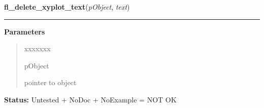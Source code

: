     \label{xformslib:library:fl_delete_xyplot_text}

    \vspace{0.5ex}

\hspace{.8\funcindent}\begin{boxedminipage}{\funcwidth}

    \raggedright \textbf{fl\_delete\_xyplot\_text}(\textit{pObject}, \textit{text})

    \vspace{-1.5ex}

    \rule{\textwidth}{0.5\fboxrule}
\setlength{\parskip}{2ex}
\setlength{\parskip}{1ex}
      \textbf{Parameters}
      \vspace{-1ex}

      \begin{quote}
        \begin{Ventry}{xxxxxxx}

          \item[pObject]

          pointer to object

        \end{Ventry}

      \end{quote}

\textbf{Status:} Untested + NoDoc + NoExample = NOT OK



    \end{boxedminipage}

    \label{xformslib:library:fl_set_xyplot_maxoverlays}

    \vspace{0.5ex}

